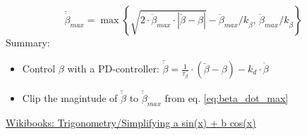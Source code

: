 \documentclass{article}
\begin{document}
\begin{equation}
\breve{\dot{\beta}}_{max} = \max{ \left\{ \sqrt{2 \cdot \ddot{\beta}_{max} \cdot |\breve{\beta} - \beta|} - \ddot{\beta}_{max} / k_{\dot{\beta}}, \, \ddot{\beta}_{max} / k_{\dot{\beta}} \right\} }
\label{eq:beta_dot_max}
\end{equation}
Summary:
\begin{itemize}
	\item{Control $\beta$ with a PD-controller: $\breve{\dot{\beta}} = \frac{1}{\tau_{\beta}} \cdot \left( \breve{\beta} - \beta \right) - k_d \cdot \dot{\beta}$ }
	\item{Clip the magintude of $\breve{\dot{\beta}}$ to $\breve{\dot{\beta}}_{max}$ from eq. \ref{eq:beta_dot_max}}
\end{itemize}

\begin{thebibliography}{1}

 \href{https://en.wikibooks.org/wiki/Trigonometry/Simplifying_a_sin(x)_+_b_cos(x)}{Wikibooks: Trigonometry/Simplifying a sin(x) + b cos(x)}

\end{thebibliography}
\end{document}
